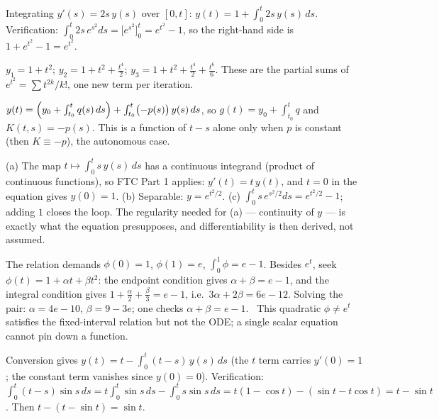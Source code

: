 \documentclass{essay}
\begin{document}
\begin{description}[leftmargin=0pt, itemsep=6pt]

  \item[\ref{ex:basic}.] Integrating $y'(s) = 2s\,y(s)$ over $[0,t]$: $y(t) = 1 + \int_0^t 2s\,y(s)\,ds$. Verification: $\int_0^t 2s\,e^{s^2} ds = \bigl[e^{s^2}\bigr]_0^t = e^{t^2} - 1$, so the right-hand side is $1 + e^{t^2} - 1 = e^{t^2}$. \checkmark

  \item[\ref{ex:picard}.] $y_1 = 1 + t^2$; $y_2 = 1 + t^2 + \tfrac{t^4}{2}$; $y_3 = 1 + t^2 + \tfrac{t^4}{2} + \tfrac{t^6}{6}$. These are the partial sums of $e^{t^2} = \sum t^{2k}/k!$, one new term per iteration.

  \item[\ref{ex:linear}.] $y(t) = \Bigl(y_0 + \int_{t_0}^t q(s)\,ds\Bigr) + \int_{t_0}^t \bigl(-p(s)\bigr)\, y(s)\, ds$, so $g(t) = y_0 + \int_{t_0}^t q$ and $K(t,s) = -p(s)$. This is a function of $t - s$ alone only when $p$ is constant (then $K \equiv -p$), the autonomous case.

  \item[\ref{ex:backward}.] (a) The map $t \mapsto \int_0^t s\,y(s)\,ds$ has a continuous integrand (product of continuous functions), so FTC Part 1 applies: $y' (t)= t\,y(t)$, and $t=0$ in the equation gives $y(0) = 1$. (b) Separable: $y = e^{t^2/2}$. (c) $\int_0^t s\,e^{s^2/2} ds = e^{t^2/2} - 1$; adding $1$ closes the loop. The regularity needed for (a) --- continuity of $y$ --- is exactly what the equation presupposes, and differentiability is then derived, not assumed.

  \item[\ref{ex:wrongway}.] The relation demands $\phi(0) = 1$, $\phi(1) = e$, $\int_0^1 \phi = e-1$. Besides $e^t$, seek $\phi(t) = 1 + \alpha t + \beta t^2$: the endpoint condition gives $\alpha + \beta = e - 1$, and the integral condition gives $1 + \tfrac{\alpha}{2} + \tfrac{\beta}{3} = e - 1$, i.e.\ $3\alpha + 2\beta = 6e - 12$. Solving the pair: $\alpha = 4e - 10$, $\beta = 9 - 3e$; one checks $\alpha + \beta = e - 1$. \checkmark\ This quadratic $\phi \ne e^t$ satisfies the fixed-interval relation but not the ODE; a single scalar equation cannot pin down a function.

  \item[\ref{ex:sine}.] Conversion gives $y(t) = t - \int_0^t (t - s)\,y(s)\,ds$ (the $t$ term carries $y'(0) = 1$; the constant term vanishes since $y(0)=0$). Verification: $\int_0^t (t-s)\sin s\,ds = t\int_0^t \sin s\, ds - \int_0^t s \sin s\, ds = t(1 - \cos t) - (\sin t - t\cos t) = t - \sin t$. Then $t - (t - \sin t) = \sin t$. \checkmark


\end{description}
\end{document}
